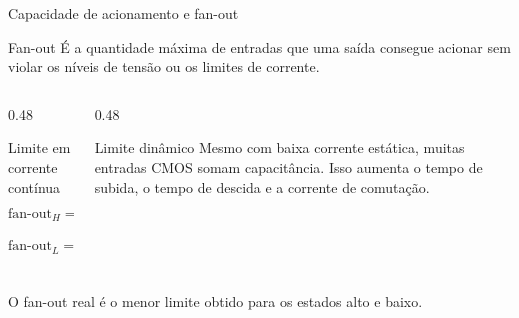 \begin{frame}{Capacidade de acionamento e fan-out}
    \begin{block}{Fan-out}
        É a quantidade máxima de entradas que uma saída consegue acionar sem
        violar os níveis de tensão ou os limites de corrente.
    \end{block}

    \begin{columns}[T]
        \begin{column}{0.48\textwidth}
            \begin{block}{Limite em corrente contínua}
                \[
                    \text{fan-out}_{H}=\frac{|I_{OH}|}{I_{IH}}
                \]
                \[
                    \text{fan-out}_{L}=\frac{I_{OL}}{|I_{IL}|}
                \]
            \end{block}
        \end{column}
        \begin{column}{0.48\textwidth}
            \begin{alertblock}{Limite dinâmico}
                Mesmo com baixa corrente estática, muitas entradas CMOS somam
                capacitância. Isso aumenta o tempo de subida, o tempo de descida
                e a corrente de comutação.
            \end{alertblock}
        \end{column}
    \end{columns}

    \centering
    O fan-out real é o menor limite obtido para os estados alto e baixo.
\end{frame}
